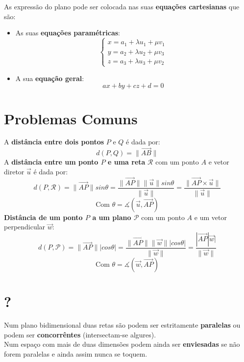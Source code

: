 \documentclass[]{report}
\begin{document}
As expressão do plano pode ser colocada nas suas \textbf{equações cartesianas} que são:
\begin{itemize}
\item As suas \textbf{equações paramétricas}:
$$
\begin{cases}
x = a_1 + \lambda u_1 + \mu v_1\\
y = a_2 + \lambda u_2 + \mu v_3\\
z = a_3 + \lambda u_3 + \mu v_2
\end{cases}
$$
\item A sua \textbf{equação geral}:
$$ax + by + cz + d = 0$$
\end{itemize}
\section{Problemas Comuns}
A \textbf{distância entre dois pontos} $P$ e $Q$ é dada por:
$$d(P, Q) = \parallel \overrightarrow{AB} \parallel$$
A \textbf{distância entre um ponto $P$ e uma reta} $\mathcal{R}$ com um ponto $A$ e vetor diretor $\vec u$ é dada por:
$$
d(P, \mathcal{R}) = \parallel \overrightarrow{AP} \parallel sin \theta =
\frac{\parallel \overrightarrow{AP} \parallel \parallel \vec u \parallel sin \theta}{\parallel \vec u \parallel} =
\frac{\parallel \overrightarrow{AP}  \times \vec u \parallel}{\parallel \vec u \parallel}
$$
$$\text{Com } \theta = \measuredangle(\vec u, \overrightarrow{AP})$$
\textbf{Distância de um ponto $P$ a um plano $\mathcal{P}$} com um ponto $A$ e um vetor perpendicular $\vec w$:
$$
d(P, \mathcal{P}) = \parallel \overrightarrow{AP} \parallel | cos \theta |=
\frac{\parallel \overrightarrow{AP} \parallel \parallel \vec w \parallel | cos \theta|}{\parallel \vec w \parallel} =
\frac{| \overrightarrow{AP} | \vec w |}{\parallel \vec w \parallel}
$$
$$\text{Com } \theta = \measuredangle(\vec w, \overrightarrow{AP})$$
\section{?}
Num plano bidimensional duas retas são podem ser estritamente \textbf{paralelas} ou podem ser \textbf{concorrêntes} (intersectam-se algures).\\
Num espaço com mais de duas dimensões podem ainda ser \textbf{enviesadas} se não forem paralelas e ainda assim nunca se toquem.
\end{document}
